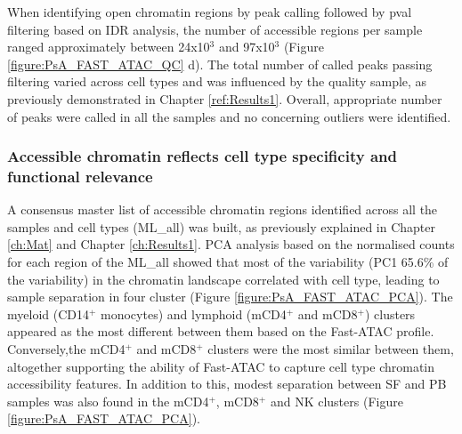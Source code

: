 When identifying open chromatin regions by peak calling followed by pval filtering based on IDR analysis, the number of accessible regions per sample ranged approximately between 24x10$^3$ and 97x10$^3$ (Figure \ref{figure:PsA_FAST_ATAC_QC} d). The total number of called peaks passing filtering varied across cell types and was influenced by the quality sample, as previously demonstrated in Chapter \ref{ref:Results1}. Overall, appropriate number of peaks were called in all the samples and no concerning outliers were identified.


\subsubsection{Accessible chromatin reflects cell type specificity and functional relevance}
A consensus master list of accessible chromatin regions identified across all the samples and cell types (ML\_all) was built, as previously explained in Chapter \ref{ch:Mat} and Chapter \ref{ch:Results1}. PCA analysis based on the normalised counts for each region of the ML\_all showed that most of the variability (PC1 65.6\% of the variability) in the chromatin landscape correlated with cell type, leading to sample separation in four cluster (Figure \ref{figure:PsA_FAST_ATAC_PCA}). The myeloid (CD14$^+$ monocytes) and lymphoid (mCD4$^+$ and mCD8$^+$) clusters appeared as the most different between them based on the Fast-ATAC profile. Conversely,the mCD4$^+$ and mCD8$^+$ clusters were the most similar between them, altogether supporting the ability of Fast-ATAC to capture cell type chromatin accessibility features. In addition to this, modest separation between SF and PB samples was also found in the mCD4$^+$, mCD8$^+$ and NK clusters (Figure \ref{figure:PsA_FAST_ATAC_PCA}).

